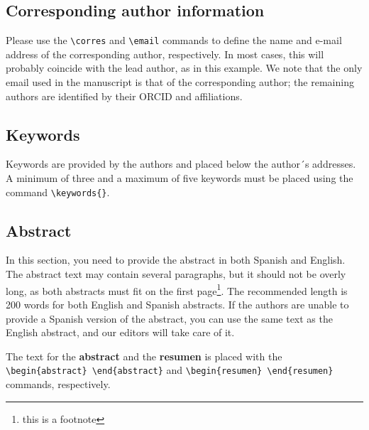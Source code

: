 \documentclass[9pt,twoside]{rmaa-rho-class/rmaa-rho}
\newcommand{\CS}[1]{\texttt{\textbackslash #1}}
\begin{document}
    \subsection{Corresponding author information}
    
        Please use the \CS{corres} and \CS{email} commands to define the name and e-mail address of the corresponding author, respectively. In most cases, this will probably coincide with the lead author, as in this example. We note that the only email used in the manuscript is that of the corresponding author; the remaining authors are identified by their ORCID and affiliations.

        \subsection{Keywords}

        Keywords are provided by the authors and placed below the author´s addresses. A minimum of three and a maximum of five keywords must be placed using the command \verb|\keywords{}|.
    
    \subsection{Abstract}
    
        In this section, you need to provide the abstract in both Spanish and English. The abstract text may contain several paragraphs, but it should not be overly long, as both abstracts must fit on the first page\footnote{this is a footnote}. The recommended length is 200 words for both English and Spanish abstracts. If the authors are unable to provide a Spanish version of the abstract, you can use the same text as the English abstract, and our editors will take care of it.
    
        The text for the {\bf abstract} and the {\bf resumen} is placed with the \verb|\begin{abstract} \end{abstract}| and \verb|\begin{resumen} \end{resumen}| commands, respectively. 
        
\end{document}
